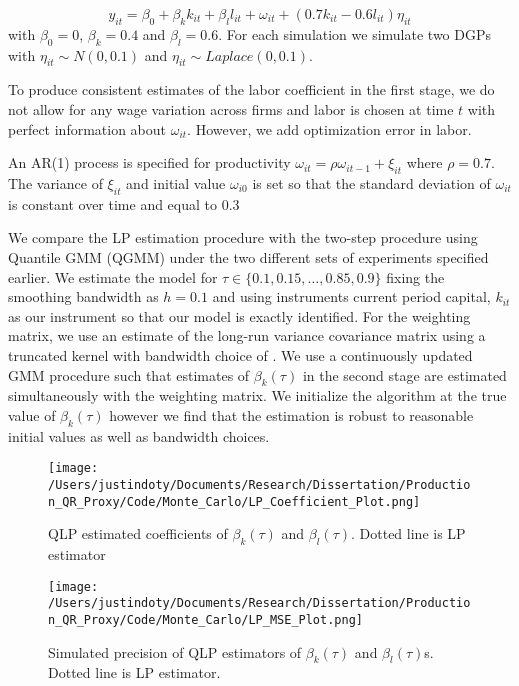 \documentclass[11pt]{article}
\begin{document}
\begin{equation}
y_{it}=\beta_{0}+\beta_{k}k_{it}+\beta_{l}l_{it}+\omega_{it}+(0.7k_{it}-0.6l_{it})\eta_{it}
\end{equation}
with $\beta_{0}=0$, $\beta_{k}=0.4$ and $\beta_{l}=0.6$. For each simulation we simulate two DGPs with $\eta_{it}\sim N(0,0.1)$ and $\eta_{it}\sim Laplace(0,0.1)$.

To produce consistent estimates of the labor coefficient in the first stage, we do not allow for any wage variation across firms and labor is chosen at time $t$ with perfect information about $\omega_{it}$. However, we add optimization error in labor.

An AR(1) process is specified for productivity $\omega_{it}=\rho\omega_{it-1}+\xi_{it}$ where $\rho=0.7$. The variance of $\xi_{it}$ and initial value $\omega_{i0}$ is set so that the standard deviation of $\omega_{it}$ is constant over time and equal to $0.3$


We compare the LP estimation procedure with the two-step procedure using Quantile GMM (QGMM) under  the two different sets of experiments specified earlier. We estimate the model for $\tau\in\{0.1, 0.15, \dots, 0.85, 0.9\}$ fixing the smoothing bandwidth as $h=0.1$ and using instruments current period capital, $k_{it}$ as our instrument so that our model is exactly identified. For the weighting matrix, we use an estimate of the long-run variance covariance matrix using a truncated kernel with bandwidth choice of \cite{Andrews1991}. We use a continuously updated GMM procedure such that estimates of $\beta_{k}(\tau)$ in the second stage are estimated simultaneously with the weighting matrix. We initialize the algorithm at the true value of $\beta_{k}(\tau)$ however we find that the estimation is robust to reasonable initial values as well as bandwidth choices.

\begin{figure}[ht]
\centering
\caption{QLP estimated coefficients of  $\beta_{k}(\tau)$ and $\beta_{l}(\tau)$. Dotted line is LP estimator}
\texttt{[image: /Users/justindoty/Documents/Research/Dissertation/Production\_QR\_Proxy/Code/Monte\_Carlo/LP\_Coefficient\_Plot.png]}
\label{LP_coefficient_plot}
\end{figure}


\begin{figure}[H]
\centering
\caption{Simulated precision of  QLP estimators of $\beta_{k}(\tau)$ and $\beta_{l}(\tau)$s. Dotted line is LP estimator.}
\texttt{[image: /Users/justindoty/Documents/Research/Dissertation/Production\_QR\_Proxy/Code/Monte\_Carlo/LP\_MSE\_Plot.png]}
\label{MSE_plot}
\end{figure}
\end{document}
